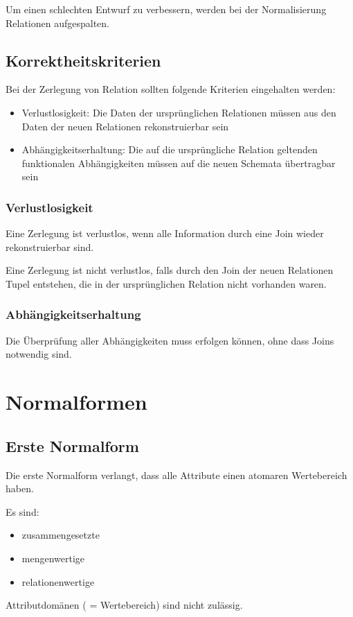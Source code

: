 Um einen schlechten Entwurf zu verbessern, werden bei der Normalisierung Relationen aufgespalten.

\subsection{Korrektheitskriterien}

Bei der Zerlegung von Relation sollten folgende Kriterien eingehalten werden:
\begin{itemize}
    \item Verlustlosigkeit: Die Daten der ursprünglichen Relationen müssen aus den Daten der neuen Relationen rekonstruierbar sein
    \item Abhängigkeitserhaltung: Die auf die ursprüngliche Relation geltenden funktionalen Abhängigkeiten müssen auf die neuen Schemata übertragbar sein
\end{itemize}

\subsubsection{Verlustlosigkeit}

Eine Zerlegung ist verlustlos, wenn alle Information durch eine Join wieder rekonstruierbar sind.

Eine Zerlegung ist nicht verlustlos, falls durch den Join der neuen Relationen Tupel entstehen, die in der ursprünglichen Relation nicht vorhanden waren.

\subsubsection{Abhängigkeitserhaltung}

Die Überprüfung aller Abhängigkeiten muss erfolgen können, ohne dass Joins notwendig sind.

\section{Normalformen}

\subsection{Erste Normalform}

Die erste Normalform verlangt, dass alle Attribute einen atomaren Wertebereich haben.

Es sind:
\begin{itemize}
    \item zusammengesetzte
    \item mengenwertige
    \item relationenwertige
\end{itemize}
Attributdomänen ( = Wertebereich) sind nicht zulässig.

